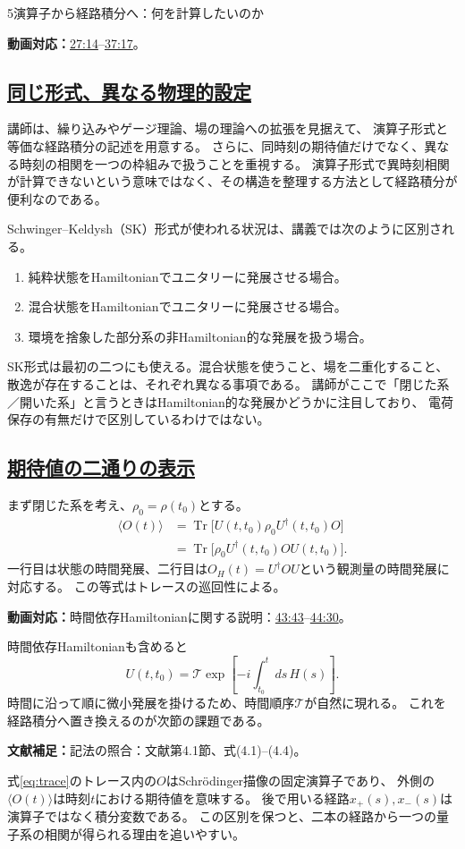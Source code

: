 \documentclass[a4paper,11pt]{ltjsarticle}
\newcommand{\subsectionlink}[1]{\subsection[#1]{\hyperlink{toc}{#1}}}
\numberwithin{equation}{section}
\newcommand{\Tr}{\operatorname{Tr}}
\newcommand{\av}[1]{\langle #1\rangle}
\newcommand{\video}[2]{\href{https://www.youtube.com/watch?v=RYxzcUhIHjk\&t=#1s}{#2}}
\newcommand{\videosource}[1]{\par\noindent\textcolor{noteblue}{\textbf{動画対応：}#1}\par\smallskip}
\newcommand{\supplement}[1]{\par\medskip\noindent\textcolor{notered}{\textbf{文献補足：}}#1\par\smallskip}
\begin{document}
\begin{lecturesection}{5}{演算子から経路積分へ：何を計算したいのか}
\label{sec:motivation}
\videosource{\video{1634}{27:14}--\video{2237}{37:17}。}
\subsectionlink{同じ形式、異なる物理的設定}
講師は、繰り込みやゲージ理論、場の理論への拡張を見据えて、
演算子形式と等価な経路積分の記述を用意する。
さらに、同時刻の期待値だけでなく、異なる時刻の相関を一つの枠組みで扱うことを重視する。
演算子形式で異時刻相関が計算できないという意味ではなく、その構造を整理する方法として経路積分が便利なのである。

Schwinger--Keldysh（SK）形式が使われる状況は、講義では次のように区別される。
\begin{enumerate}
 \item 純粋状態をHamiltonianでユニタリーに発展させる場合。
 \item 混合状態をHamiltonianでユニタリーに発展させる場合。
 \item 環境を捨象した部分系の非Hamiltonian的な発展を扱う場合。
\end{enumerate}
SK形式は最初の二つにも使える。混合状態を使うこと、場を二重化すること、
散逸が存在することは、それぞれ異なる事項である。
講師がここで「閉じた系／開いた系」と言うときはHamiltonian的な発展かどうかに注目しており、
電荷保存の有無だけで区別しているわけではない。

\subsectionlink{期待値の二通りの表示}
まず閉じた系を考え、$\rho_0=\rho(t_0)$とする。
\begin{align}
 \av{O(t)}
   &=\Tr\bigl[U(t,t_0)\rho_0U^\dagger(t,t_0)O\bigr]\\
   &=\Tr\bigl[\rho_0U^\dagger(t,t_0)O U(t,t_0)\bigr].
 \label{eq:trace}
\end{align}
一行目は状態の時間発展、二行目は$O_H(t)=U^\dagger O U$という観測量の時間発展に対応する。
この等式はトレースの巡回性による。
\videosource{時間依存Hamiltonianに関する説明：\video{2623}{43:43}--\video{2670}{44:30}。}
時間依存Hamiltonianも含めると
\begin{equation}
 U(t,t_0)=\mathcal T\exp\left[-i\int_{t_0}^t ds\,H(s)\right].
\end{equation}
時間に沿って順に微小発展を掛けるため、時間順序$\mathcal T$が自然に現れる。
これを経路積分へ置き換えるのが次節の課題である。

\supplement{記法の照合：文献\cite{Pajer:2026fuo}第4.1節、式(4.1)--(4.4)。}
式\eqref{eq:trace}のトレース内の$O$はSchr\"odinger描像の固定演算子であり、
外側の$\av{O(t)}$は時刻$t$における期待値を意味する。
後で用いる経路$x_+(s),x_-(s)$は演算子ではなく積分変数である。
この区別を保つと、二本の経路から一つの量子系の相関が得られる理由を追いやすい。
\end{lecturesection}
\end{document}
